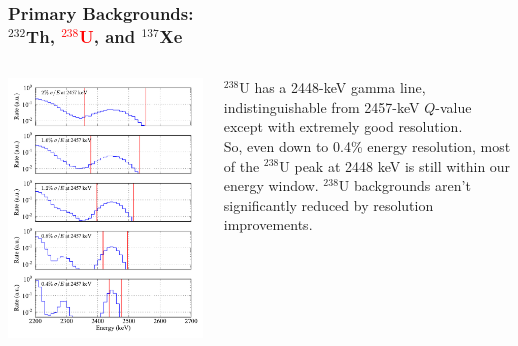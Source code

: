 \documentclass{beamer}
\begin{document}
\begin{frame}
\begin{center}
\frametitle{\hfill Primary Backgrounds:\\\hfill $^{232}$Th, \textcolor{red}{$^{238}$U}, and $^{137}$Xe}
\end{center}
\begin{columns}
\begin{column}{.6\textwidth}
\includegraphics[keepaspectratio=true,width=\textwidth]{U_Spectra_vs_Res.pdf}
\end{column}
\begin{column}{.4\textwidth}
\vspace{0.5cm}

$^{238}$U has a 2448-keV gamma line, indistinguishable from 2457-keV $Q$-value except with extremely good resolution.\\[\baselineskip]

So, even down to 0.4\% energy resolution, most of the $^{238}$U peak at 2448 keV is still within our energy window.  $^{238}$U backgrounds aren't significantly reduced by resolution improvements.
\end{column}
\end{columns}
\end{frame}
\end{document}
